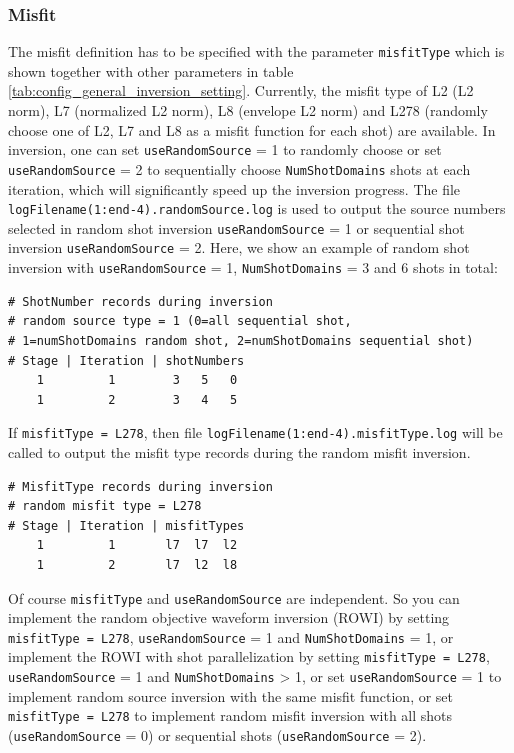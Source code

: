 \documentclass[pdftex,a4paper,parskip,listof=totoc,bibliography=totoc,onehalfspacing,12pt]{scrreprt}
\begin{document}
\subsubsection{Misfit}
The misfit definition has to be specified with the parameter \verb+misfitType+ which is shown together with other parameters in table \ref{tab:config_general_inversion_setting}. Currently, the misfit type of L2 (L2 norm), L7 (normalized L2 norm), L8 (envelope L2 norm) and L278 (randomly choose one of L2, L7 and L8 as a misfit function for each shot) are available. In inversion, one can set \verb+useRandomSource+ = 1 to randomly choose or set \verb+useRandomSource+ = 2 to sequentially choose \verb+NumShotDomains+ shots at each iteration, which will significantly speed up the inversion progress. The file \verb+logFilename(1:end-4).randomSource.log+ is used to output the source numbers selected in random shot inversion \verb+useRandomSource+ = 1 or sequential shot inversion \verb+useRandomSource+ = 2. Here, we show an example of random shot inversion with \verb+useRandomSource+ = 1, \verb+NumShotDomains+ = 3 and 6 shots in total:
\begin{verbatim}
# ShotNumber records during inversion
# random source type = 1 (0=all sequential shot,
# 1=numShotDomains random shot, 2=numShotDomains sequential shot)
# Stage | Iteration | shotNumbers
    1         1        3   5   0
    1         2        3   4   5
\end{verbatim}
If \verb+misfitType = L278+, then file \verb+logFilename(1:end-4).misfitType.log+ will be called to output the misfit type records during the random misfit inversion.
\begin{verbatim}
# MisfitType records during inversion
# random misfit type = L278
# Stage | Iteration | misfitTypes
    1         1       l7  l7  l2
    1         2       l7  l2  l8
\end{verbatim}
Of course \verb+misfitType+ and \verb+useRandomSource+ are independent. So you can implement the random objective waveform inversion (ROWI) \citep{pan2020random} by setting \verb+misfitType = L278+, \verb+useRandomSource+ = 1 and \verb+NumShotDomains+ = 1, or implement the ROWI with shot parallelization by setting \verb+misfitType = L278+, \verb+useRandomSource+ = 1 and \verb+NumShotDomains+ > 1, or set \verb+useRandomSource+ = 1 to implement random source inversion with the same misfit function, or set \verb+misfitType = L278+ to implement random misfit inversion with all shots (\verb+useRandomSource+ = 0) or sequential shots (\verb+useRandomSource+ = 2).
\end{document}
